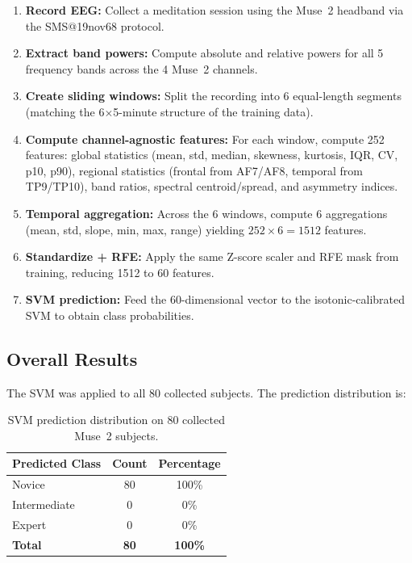 \documentclass[12pt,a4paper]{article}
\begin{document}
\begin{enumerate}
  \item \textbf{Record EEG:} Collect a meditation session using the Muse~2 headband via the SMS@19nov68 protocol.
  \item \textbf{Extract band powers:} Compute absolute and relative powers for all 5 frequency bands across the 4 Muse~2 channels.
  \item \textbf{Create sliding windows:} Split the recording into 6 equal-length segments (matching the 6$\times$5-minute structure of the training data).
  \item \textbf{Compute channel-agnostic features:} For each window, compute 252 features: global statistics (mean, std, median, skewness, kurtosis, IQR, CV, p10, p90), regional statistics (frontal from AF7/AF8, temporal from TP9/TP10), band ratios, spectral centroid/spread, and asymmetry indices.
  \item \textbf{Temporal aggregation:} Across the 6 windows, compute 6 aggregations (mean, std, slope, min, max, range) yielding $252 \times 6 = 1512$ features.
  \item \textbf{Standardize + RFE:} Apply the same Z-score scaler and RFE mask from training, reducing 1512 to 60 features.
  \item \textbf{SVM prediction:} Feed the 60-dimensional vector to the isotonic-calibrated SVM to obtain class probabilities.
\end{enumerate}

\subsection{Overall Results}

The SVM was applied to all 80 collected subjects. The prediction distribution is:

\begin{table}[H]
\centering
\caption{SVM prediction distribution on 80 collected Muse~2 subjects.}
\label{tab:collected_results}
\begin{tabular}{lcc}
\toprule
\textbf{Predicted Class} & \textbf{Count} & \textbf{Percentage} \\
\midrule
Novice       & 80 & 100\% \\
Intermediate &  0 &  0\% \\
Expert       &  0 &  0\% \\
\midrule
\textbf{Total} & \textbf{80} & \textbf{100\%} \\
\bottomrule
\end{tabular}
\end{table}
\end{document}
